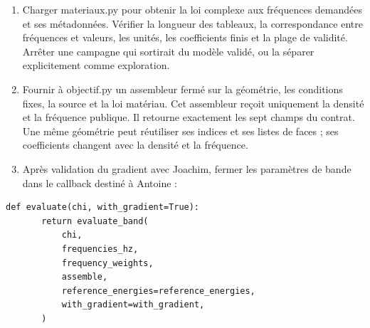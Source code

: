 \documentclass[11pt,a4paper]{article}
\begin{document}
\begin{enumerate}
\item Charger {\small\ttfamily materiaux.py} pour obtenir la loi complexe aux fréquences demandées et ses métadonnées. Vérifier la longueur des tableaux, la correspondance entre fréquences et valeurs, les unités, les coefficients finis et la plage de validité. Arrêter une campagne qui sortirait du modèle validé, ou la séparer explicitement comme exploration.
\item Fournir à {\small\ttfamily objectif.py} un assembleur fermé sur la géométrie, les conditions fixes, la source et la loi matériau. Cet assembleur reçoit uniquement la densité et la fréquence publique. Il retourne exactement les sept champs du contrat. Une même géométrie peut réutiliser ses indices et ses listes de faces ; ses coefficients changent avec la densité et la fréquence.
\item Après validation du gradient avec Joachim, fermer les paramètres de bande dans le callback destiné à Antoine :
\end{enumerate}

\begin{Verbatim}[breaklines,breakanywhere,fontsize=\footnotesize]
   def evaluate(chi, with_gradient=True):
       return evaluate_band(
           chi,
           frequencies_hz,
           frequency_weights,
           assemble,
           reference_energies=reference_energies,
           with_gradient=with_gradient,
       )
\end{Verbatim}
\end{document}
